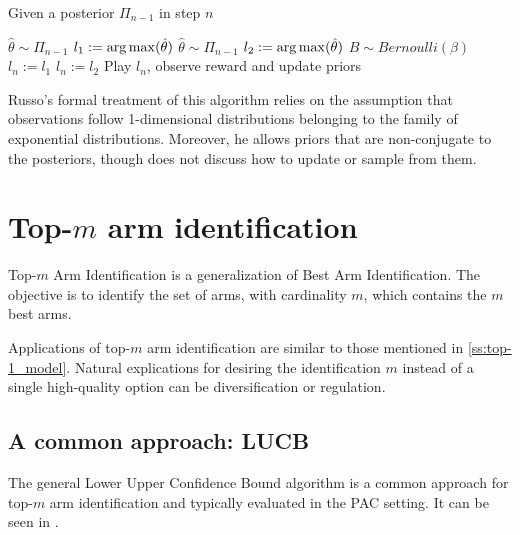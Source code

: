 \begin{algorithm}[H]
    \caption{Given a posterior $\Pi_{n-1}$ in step $n$}
    \label{alg:TTTS}
  \begin{algorithmic}
    \State $\hat{\theta} \sim \Pi_{n-1}$
    \State $l_1 := \operatorname*{arg\,max}(\hat{\theta})$
    \Repeat
      \State $\hat{\theta} \sim \Pi_{n-1}$
      \State $l_2 := \operatorname*{arg\,max}(\hat{\theta})$
    \State $B \sim Bernoulli(\beta)$
      \State $l_n := l_1$
    \Else
      \State $l_n := l_2$
    \EndIf
    \State Play $l_n$, observe reward and update priors
  \end{algorithmic}
\end{algorithm}

Russo's formal treatment of this algorithm relies on the assumption that
observations follow 1-dimensional distributions belonging to the family of
exponential distributions. Moreover, he allows priors that are non-conjugate to
the posteriors, though does not discuss how to update or sample from them.

\section{Top-$m$ arm identification}

Top-$m$ Arm Identification is a generalization of Best Arm Identification. The
objective is to identify the set of arms, with cardinality $m$, which contains
the $m$ best arms.

Applications of top-$m$ arm identification are similar to those mentioned in
\ref{ss:top-1_model}. Natural explications for desiring the identification $m$
instead of a single high-quality option can be diversification or regulation.

\subsection{A common approach: LUCB}
The general Lower Upper Confidence Bound algorithm is a common approach for
top-$m$ arm identification \cite{kaufmann2013information} and typically evaluated in the PAC setting. It can be
seen in .

